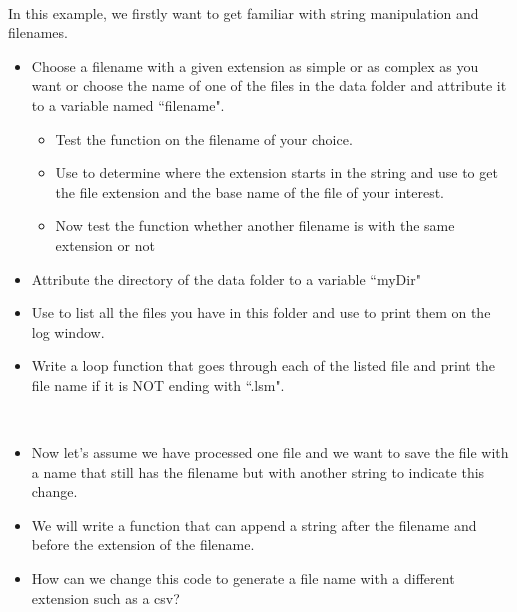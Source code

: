 \begin{frame}[fragile]
	\begin{example}~\par
		In this example, we firstly want to get familiar with string manipulation and filenames.
		\begin{itemize}
			\item Choose a filename with a given extension as simple or as complex as you want or choose the name of one of the files in the data folder and attribute it to a variable named ``filename".
			\begin{itemize}
				\item Test the function  on the filename of your choice.
				\item Use  to determine where the extension starts in the string and use  to get the file extension and the base name of the file of your interest.
				\item Now test the function  whether another filename is with the same extension or not
			\end{itemize}
			\item Attribute the directory of the data folder to a variable ``myDir"
			\item Use  to list all the files you have in this folder and use  to print them on the log window.
			\item Write a loop function that goes through each of the listed file and print the file name if it is NOT ending with ``.lsm".
		\end{itemize}
	\end{example}
\end{frame}


\begin{frame}[fragile]
  \begin{example}~\par
    \begin{itemize}
    \item Now let's assume we have processed one file and we want to save the file with a name that still has the filename but with another string to indicate this change.
    \item We will write a function that can append a string after the filename and before the extension of the filename.~\par
      
      \item How can we change this code to generate a file name with a different extension such as a csv?
    \end{itemize}
  \end{example}
\end{frame}


